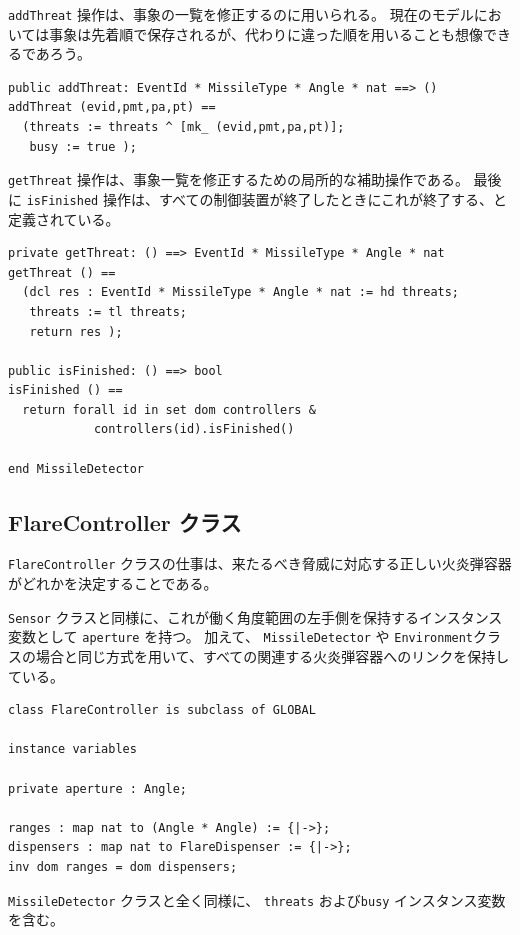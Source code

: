 \documentclass[\pformat,12pt]{jreport}
\begin{document}
\texttt{addThreat} 操作は、事象の一覧を修正するのに用いられる。
現在のモデルにおいては事象は先着順で保存されるが、代わりに違った順を用いることも想像できるであろう。

\begin{lstlisting}
public addThreat: EventId * MissileType * Angle * nat ==> ()
addThreat (evid,pmt,pa,pt) == 
  (threats := threats ^ [mk_ (evid,pmt,pa,pt)];
   busy := true );
\end{lstlisting}

 \texttt{getThreat} 操作は、事象一覧を修正するための局所的な補助操作である。
最後に \texttt{isFinished} 操作は、すべての制御装置が終了したときにこれが終了する、と定義されている。

\begin{lstlisting}
private getThreat: () ==> EventId * MissileType * Angle * nat
getThreat () ==
  (dcl res : EventId * MissileType * Angle * nat := hd threats;
   threats := tl threats;
   return res );

public isFinished: () ==> bool
isFinished () ==
  return forall id in set dom controllers &
            controllers(id).isFinished()

end MissileDetector
\end{lstlisting}

\subsection{FlareController クラス}

 \texttt{FlareController}  クラスの仕事は、来たるべき脅威に対応する正しい火炎弾容器がどれかを決定することである。

 \texttt{Sensor} クラスと同様に、これが働く角度範囲の左手側を保持するインスタンス変数として \texttt{aperture} を持つ。
加えて、 \texttt{MissileDetector} や \texttt{Environment}クラスの場合と同じ方式を用いて、すべての関連する火炎弾容器へのリンクを保持している。

\begin{lstlisting}
class FlareController is subclass of GLOBAL

instance variables

private aperture : Angle;

ranges : map nat to (Angle * Angle) := {|->};
dispensers : map nat to FlareDispenser := {|->};
inv dom ranges = dom dispensers;
\end{lstlisting}

 \texttt{MissileDetector} クラスと全く同様に、 \texttt{threats} および\texttt{busy} インスタンス変数を含む。
\end{document}
